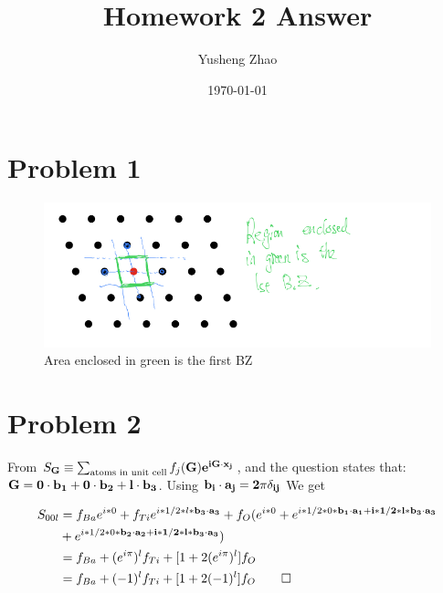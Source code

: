 \documentclass[11pt]{article}
\author{Yusheng Zhao}
\date{\today}
\title{Homework 2 Answer}
\begin{document}
\maketitle


\section{Problem 1}
\label{sec:org65755ba}
\begin{figure}[htbp]
\centering
\includegraphics[width=.9\linewidth]{./bz1st.png}
\caption{Area enclosed in green is the first BZ}
\end{figure}


\section{Problem 2}
\label{sec:org85eff07}
From \(S_{\bf{G}} \equiv \sum_{\text{atoms in unit cell}} f_{j}(\bf{G}) e^{i
\bf{G}\cdot \bf{x}_{j}}\), and the question states that: \(\bf{G} = 0 \cdot
\bf{b}_{1} + 0 \cdot \bf{b}_{2} + l \cdot \bf{b}_{3}\). Using \(\bf{b}_{i} \cdot
\bf{a}_{j} = 2\pi \delta_{ij}\) We get

\begin{align}
S_{00l} & = f_{Ba} e^{i * 0} + f_{Ti} e^{i * 1/2 *l * \bf{b}_{3} \cdot \bf{a}_{3} } + f_{O}(e^{i * 0 } + e^{i * 1 / 2 * 0 * \bf{b}_{1} \cdot \bf{a}_{1} + i * 1 / 2 * l * \bf{b}_{3} \cdot \bf{a}_{3}} \\
       &  + e^{i * 1 / 2 * 0 * \bf{b}_{2} \cdot \bf{a}_{2} + i * 1 / 2 * l * \bf{b}_{3} \cdot \bf{a}_{3}}) \\
       & = f_{Ba} + (e^{i\pi})^{l} f_{Ti} + [1 + 2(e^{i\pi})^{l}] f_{O} \\
       & = f_{Ba} + (-1)^{l}f_{Ti} + [1+2(-1)^{l}]f_{O} \qed
\end{align}
\end{document}
